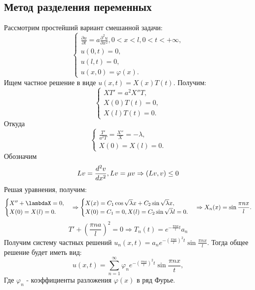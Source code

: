 \documentclass[11pt]{article}
\begin{document}
\subsection{Метод разделения переменных}
\label{sec:orgf50c6ec}
Рассмотрим простейший вариант смешанной задачи:
\begin{equation}
\begin{cases}
\frac{\partial u}{\partial t} = a\frac{\partial^2 u}{\partial x^2}, 0 < x < l, 0 < t < +\infty, \\
u(0, t) = 0, \\
u(l, t) = 0, \\
u(x, 0) = \varphi(x).
\end{cases}
\end{equation}
Ищем частное решение в виде $u(x, t) = X(x)T(t)$. Получим:
\begin{equation}
\begin{cases}
XT' = a^2X''T, \\
X(0)T(t) = 0, \\
X(l)T(t) = 0.
\end{cases}
\end{equation}
Откуда
\begin{equation}
\begin{cases}
\frac{T'}{a^2T} = \frac{X''}{X} = -\lambda, \\
X(0) = X(l) = 0.
\end{cases}
\end{equation}
Обозначим
\begin{equation}
Lv = \frac{d^2v}{dx^2}, \\
Lv = \mu v \Rightarrow (Lv, v) \leq 0
\end{equation}
Решая уравнения, получим:
\begin{equation}
\begin{cases}
X'' + \lambdaX = 0, \\
X(0) = X(l) = 0.
\end{cases}
\Rightarrow
\begin{cases}
X(x) = C_1\cos\sqrt{\lambda}x + C_2\sin\sqrt{\lambda}x, \\
X(0) = C_1 = 0, X(l) = C_2\sin\sqrt{\lambda}l = 0.
\end{cases}
\Rightarrow
X_{n}(x) = \sin\frac{\pi nx}l.
\end{equation}
\begin{equation}
T' + \left(\frac{\pi n a}l\right)^2 = 0
\Rightarrow
T_n(t) = e^{-\frac{\pi n a}lt}a_n
\end{equation}
Получим систему частных решений $u_n(x, t) = a_ne^{-\left(\frac{\pi na}l\right)^2t}\sin\frac{\pi n x}l$.
Тогда общее решение будет иметь вид:
\begin{equation}
u(x, t) = \sum_{n = 1}^{\infty}\varphi_ne^{-\left(\frac{\pi n a}l\right)^2t}\sin\frac{\pi nx}t,
\end{equation}
Где $\varphi_n$ - коэффициенты разложения $\varphi(x)$ в ряд Фурье.
\end{document}
